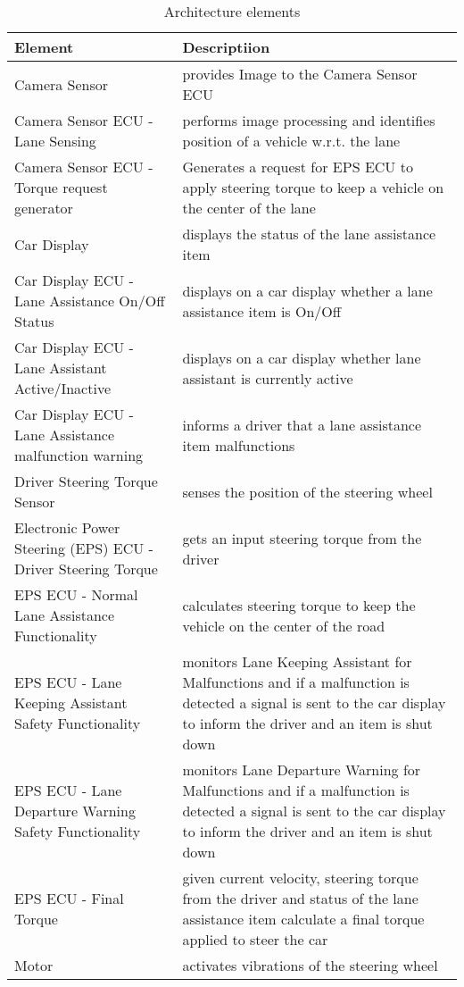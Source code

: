 \begin{table}[!htpb]
\caption{Architecture elements}
\begin{center}
\scriptsize
\renewcommand{\arraystretch}{1.4}
\begin{tabular}{ L{3.0cm}|L{9.8cm}  }
 \hline
{}
\textbf{Element} & \textbf{Descriptiion} \\\hline
Camera Sensor &
provides Image to the Camera Sensor ECU\\\hline
Camera Sensor ECU - Lane Sensing &
performs image processing and identifies position of a vehicle w.r.t. the lane\\\hline
Camera Sensor ECU - Torque request generator & 
Generates a request for EPS ECU to apply steering torque to keep a vehicle on the center of the lane\\\hline
Car Display &
displays the status of the lane assistance item\\\hline
Car Display ECU - Lane Assistance On/Off Status &
displays on a car display whether a lane assistance item is On/Off\\\hline
Car Display ECU - Lane Assistant Active/Inactive &
displays on a car display whether lane assistant is currently active\\\hline
Car Display ECU - Lane Assistance malfunction warning &
informs a driver that a lane assistance item malfunctions \\\hline
Driver Steering Torque Sensor &
senses the position of the steering wheel\\\hline
Electronic Power Steering (EPS) ECU - Driver Steering Torque & 
gets an input steering torque from the driver\\\hline
EPS ECU - Normal Lane Assistance Functionality &
calculates steering torque to keep the vehicle on the center of the road\\\hline
EPS ECU - Lane Keeping Assistant Safety Functionality &
monitors  Lane Keeping Assistant for Malfunctions and if a malfunction is 
  detected a signal is sent to the car display to inform the driver and 
  an item is shut down\\\hline
EPS ECU - Lane Departure Warning Safety Functionality &
monitors Lane Departure Warning for Malfunctions and if a malfunction is 
  detected a signal is sent to the car display to inform the driver and 
  an item is shut down\\\hline
EPS ECU - Final Torque &
given current velocity, steering torque from the driver and status of the 
lane assistance item calculate a final torque applied to steer the car
\\\hline
Motor &
activates vibrations of the steering wheel\\\hline
\end{tabular}
\end{center}
\label{tab:arch-elements}
\end{table}
